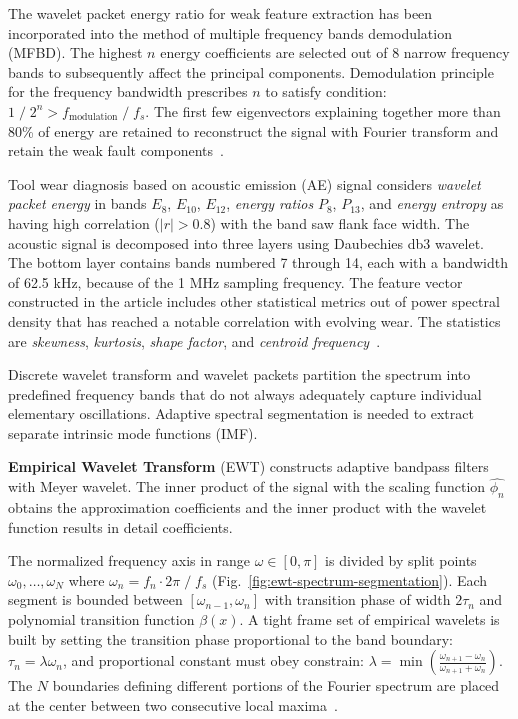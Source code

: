 The wavelet packet energy ratio for weak feature extraction has been incorporated into the method of multiple frequency bands demodulation (MFBD). The highest $n$ energy coefficients are selected out of 8 narrow frequency bands to subsequently affect the principal components. Demodulation principle for the frequency bandwidth prescribes $n$ to satisfy condition: $1\;/\;2^n > f_{\mathrm{modulation}}\;/\;f_s$. The first few eigenvectors explaining together more than 80\% of energy are retained to reconstruct the signal with Fourier transform and retain the weak fault components~\cite{song_mfbd_2021}.

Tool wear diagnosis based on acoustic emission (AE) signal considers \emph{wavelet packet energy} in bands $E_{8}$, $E_{10}$, $E_{12}$, \emph{energy ratios} $P_{8}$, $P_{13}$, and \emph{energy entropy} as having high correlation ($|r| > 0.8$) with the band saw flank face width. The acoustic signal is decomposed into three layers using Daubechies db3 wavelet. The bottom layer contains bands numbered 7 through 14, each with a bandwidth of 62.5 kHz, because of the 1 MHz sampling frequency. The feature vector constructed in the article includes other statistical metrics out of power spectral density that has reached a notable correlation with evolving wear. The statistics are \emph{skewness}, \emph{kurtosis}, \emph{shape factor}, and \emph{centroid frequency}~\cite{zhuo_research_2022}.

Discrete wavelet transform and wavelet packets partition the spectrum into predefined frequency bands that do not always adequately capture individual elementary oscillations. Adaptive spectral segmentation is needed to extract separate intrinsic mode functions (IMF).

\textbf{Empirical Wavelet Transform} (EWT) constructs adaptive bandpass filters with Meyer wavelet. The inner product of the signal with the scaling function $\hat{\phi_n}$ obtains the approximation coefficients and the inner product with the wavelet function results in detail coefficients.

The normalized frequency axis in range $\omega \in [0, \pi]$ is divided by split points $\omega_0, \dots, \omega_N$ where $\omega_n = f_n \cdot 2 \pi\;/\;f_s$ (Fig.~\ref{fig:ewt-spectrum-segmentation}). Each segment is bounded between $[\omega_{n-1}, \omega_n]$ with transition phase of width $2\tau_n$ and polynomial transition function $\beta(x)$. A tight frame set of empirical wavelets is built by setting the transition phase proportional to the band boundary: $\tau_n = \lambda \omega_n$, and proportional constant must obey constrain: $\lambda = \min\left(\frac{\omega_{n+1} - \omega_n}{\omega_{n+1} + \omega_n}\right)$. The $N$ boundaries defining different portions of the Fourier spectrum are placed at the center between two consecutive local maxima~\cite{gilles_empirical_2013}.

